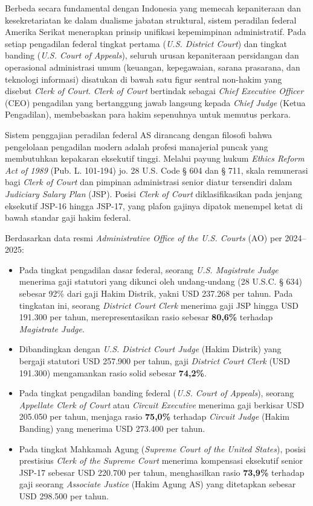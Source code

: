 \documentclass[12pt, a4paper]{article}
\begin{document}
Berbeda secara fundamental dengan Indonesia yang memecah kepaniteraan dan kesekretariatan ke dalam dualisme jabatan struktural, sistem peradilan federal Amerika Serikat menerapkan prinsip unifikasi kepemimpinan administratif. Pada setiap pengadilan federal tingkat pertama (\textit{U.S. District Court}) dan tingkat banding (\textit{U.S. Court of Appeals}), seluruh urusan kepaniteraan persidangan dan operasional administrasi umum (keuangan, kepegawaian, sarana prasarana, dan teknologi informasi) disatukan di bawah satu figur sentral non-hakim yang disebut \textit{Clerk of Court}. \textit{Clerk of Court} bertindak sebagai \textit{Chief Executive Officer} (CEO) pengadilan yang bertanggung jawab langsung kepada \textit{Chief Judge} (Ketua Pengadilan), membebaskan para hakim sepenuhnya untuk memutus perkara.

Sistem penggajian peradilan federal AS dirancang dengan filosofi bahwa pengelolaan pengadilan modern adalah profesi manajerial puncak yang membutuhkan kepakaran eksekutif tinggi. Melalui payung hukum \textit{Ethics Reform Act of 1989} (Pub. L. 101-194) jo. 28 U.S. Code § 604 dan § 711, skala remunerasi bagi \textit{Clerk of Court} dan pimpinan administrasi senior diatur tersendiri dalam \textit{Judiciary Salary Plan} (JSP). Posisi \textit{Clerk of Court} diklasifikasikan pada jenjang eksekutif JSP-16 hingga JSP-17, yang plafon gajinya dipatok menempel ketat di bawah standar gaji hakim federal.

Berdasarkan data resmi \textit{Administrative Office of the U.S. Courts} (AO) per 2024--2025:
\begin{itemize}
    \item Pada tingkat pengadilan dasar federal, seorang \textit{U.S. Magistrate Judge} menerima gaji statutori yang dikunci oleh undang-undang (28 U.S.C. § 634) sebesar 92\% dari gaji Hakim Distrik, yakni USD 237.268 per tahun. Pada tingkatan ini, seorang \textit{District Court Clerk} menerima gaji JSP hingga USD 191.300 per tahun, merepresentasikan rasio sebesar \textbf{80,6\%} terhadap \textit{Magistrate Judge}.
    \item Dibandingkan dengan \textit{U.S. District Court Judge} (Hakim Distrik) yang bergaji statutori USD 257.900 per tahun, gaji \textit{District Court Clerk} (USD 191.300) mengamankan rasio solid sebesar \textbf{74,2\%}.
    \item Pada tingkat pengadilan banding federal (\textit{U.S. Court of Appeals}), seorang \textit{Appellate Clerk of Court} atau \textit{Circuit Executive} menerima gaji berkisar USD 205.050 per tahun, menjaga rasio \textbf{75,0\%} terhadap \textit{Circuit Judge} (Hakim Banding) yang menerima USD 273.400 per tahun.
    \item Pada tingkat Mahkamah Agung (\textit{Supreme Court of the United States}), posisi prestisius \textit{Clerk of the Supreme Court} menerima kompensasi eksekutif senior JSP-17 sebesar USD 220.700 per tahun, menghasilkan rasio \textbf{73,9\%} terhadap gaji seorang \textit{Associate Justice} (Hakim Agung AS) yang ditetapkan sebesar USD 298.500 per tahun.
\end{itemize}
\end{document}
